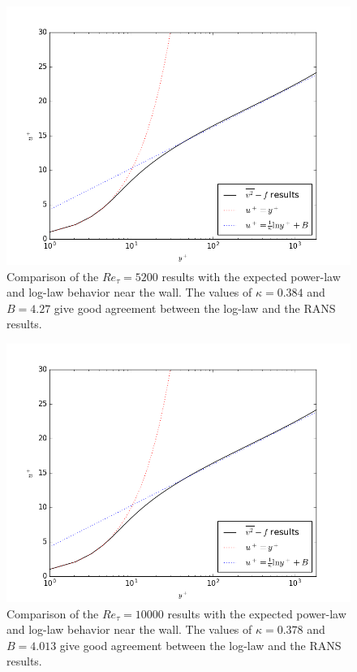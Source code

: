\documentclass[a4paper,11pt]{article}
\begin{document}
\begin{figure}
 \centering
 \includegraphics[width=\textwidth]{loglaw_5200}
 \caption{Comparison of the $Re_{\tau} = 5200$ results with the expected power-law and log-law behavior near the wall. The values of $\kappa = 0.384$ and $B = 4.27$ give good agreement between the log-law and the RANS results.}
 \label{fig:loglaw}
\end{figure}

\begin{figure}
 \centering
 \includegraphics[width=\textwidth]{loglaw_5200}
 \caption{Comparison of the $Re_{\tau} = 10000$ results with the expected power-law and log-law behavior near the wall. The values of $\kappa = 0.378$ and $B = 4.013$ give good agreement between the log-law and the RANS results.}
 \label{fig:loglaw10000}
\end{figure}
\end{document}
